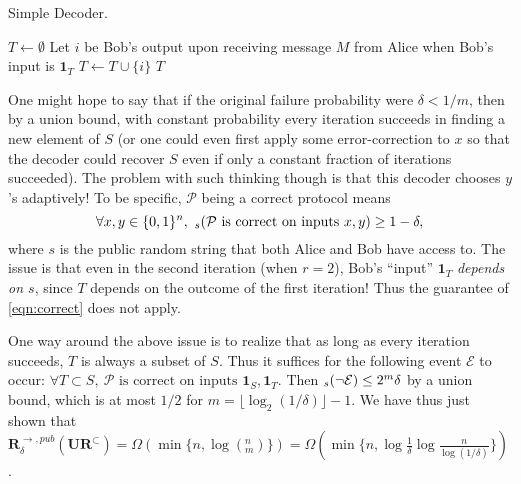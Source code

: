 \documentclass[11pt]{article}
\let\Pr\relax
\DeclareMathOperator*{\Pr}{\mathbb{P}}
\newcommand{\dec}{\textsf{DEC}\xspace}
\newcommand{\ur}{\mathbf{UR}\xspace}
\newcommand{\randcom}{\mathbf{R}}
\begin{document}
\begin{algorithm}[H] 
  \caption{Simple Decoder.} \label{algo:wrong}
  \begin{algorithmic}[1]
    \Procedure{$\dec$}{$M$}
    \State $T\leftarrow \emptyset$
      \State Let $i$ be Bob's output upon receiving message $M$ from Alice when Bob's input is $\mathbf{1}_T$
      \State $T \leftarrow T \cup\{i\}$
    \EndFor
    \State \Return $T$
    \EndProcedure
  \end{algorithmic}
\end{algorithm}

One might hope to say that if the original failure probability were $\delta < 1/m$, then by a union bound, with constant probability every iteration succeeds in finding a new element of $S$ (or one could even first apply some error-correction to $x$ so that the decoder could recover $S$ even if only a constant fraction of iterations succeeded). The problem with such thinking though is that this decoder chooses $y$'s adaptively! To be specific, $\mathcal{P}$ being a correct protocol means
\begin{equation}
\forall x,y\in\{0,1\}^n,\ \Pr_s(\mathcal{P}\text{ is correct on inputs }x,y) \ge 1-\delta , \label{eqn:correct}
\end{equation}
where $s$ is the public random string that both Alice and Bob have access to. The issue is that even in the second iteration (when $r=2$), Bob's ``input'' $\mathbf{1}_T$ {\em depends on $s$}, since $T$ depends on the outcome of the first iteration! Thus the guarantee of \eqref{eqn:correct} does not apply.

One way around the above issue is to realize that as long as every iteration succeeds, $T$ is always a subset of $S$. Thus it suffices for the following event $\mathcal{E}$ to occur: $\forall T\subset S,\ \mathcal{P}\text{ is correct on inputs }\mathbf{1}_S, \mathbf{1}_T$. Then $\Pr_s(\neg \mathcal{E}) \le 2^m\delta$ by a union bound, which is at most $1/2$ for $m = \lfloor \log_2(1/\delta)\rfloor - 1$. We have thus just shown that $\randcom^{\rightarrow,pub}_\delta(\ur^\subset) = \Omega(\min\{n, \log(^n_m)\}) = \Omega(\min\{n, \log\frac 1{\delta}\log \frac n{\log(1/\delta)}\})$.
\end{document}
